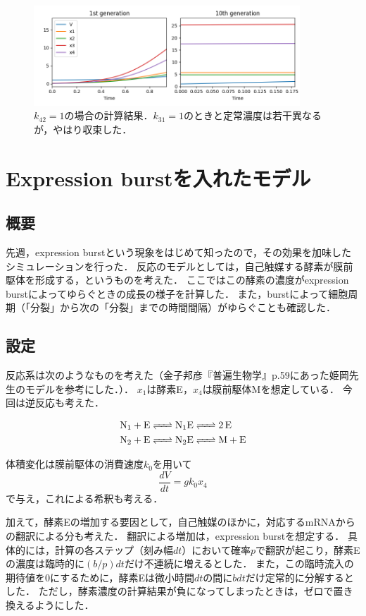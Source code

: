 \documentclass[a4paper,11pt]{jsarticle}
\begin{document}
\begin{figure}[htbp]
  \centering
  \includegraphics[width=10cm]{couple_pure_k42=1.png}
  \caption{$k_{42}=1$の場合の計算結果．$k_{31}=1$のときと定常濃度は若干異なるが，やはり収束した．}
  \label{fig:cp2}
\end{figure}

\section{Expression burstを入れたモデル}
\subsection{概要}
先週，expression burstという現象をはじめて知ったので，その効果を加味したシミュレーションを行った．
反応のモデルとしては，自己触媒する酵素が膜前駆体を形成する，というものを考えた．
ここではこの酵素の濃度がexpression burstによってゆらぐときの成長の様子を計算した．
また，burstによって細胞周期（「分裂」から次の「分裂」までの時間間隔）がゆらぐことも確認した．

\subsection{設定}
反応系は次のようなものを考えた（金子邦彦『普遍生物学』p.59にあった姫岡先生のモデルを参考にした．）．
$x_1$は酵素E，$x_4$は膜前駆体Mを想定している．
今回は逆反応も考えた．

\begin{align}
  &\ce{N1 + E <=> N1E <=> 2E}\\
  &\ce{N2 + E <=> N2E <=> M + E }
\end{align}

体積変化は膜前駆体の消費速度$k_0$を用いて
\begin{equation}
  \frac{dV}{dt} = g k_0 x_4
\end{equation}
で与え，これによる希釈も考える．

加えて，酵素Eの増加する要因として，自己触媒のほかに，対応するmRNAからの翻訳による分も考えた．
翻訳による増加は，expression burstを想定する．
具体的には，計算の各ステップ（刻み幅$dt$）において確率$p$で翻訳が起こり，酵素Eの濃度は臨時的に$(b/p)dt$だけ不連続に増えるとした．
また，この臨時流入の期待値を0にするために，酵素Eは微小時間$dt$の間に$bdt$だけ定常的に分解するとした．
ただし，酵素濃度の計算結果が負になってしまったときは，ゼロで置き換えるようにした．
\end{document}
